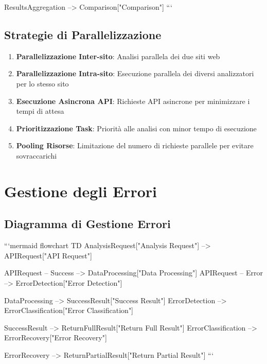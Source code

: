     ResultsAggregation --> Comparison["Comparison"]
```

\subsection{Strategie di Parallelizzazione}
\begin{enumerate}
    \item \textbf{Parallelizzazione Inter-sito}: Analisi parallela dei due siti web
    \item \textbf{Parallelizzazione Intra-sito}: Esecuzione parallela dei diversi analizzatori per lo stesso sito
    \item \textbf{Esecuzione Asincrona API}: Richieste API asincrone per minimizzare i tempi di attesa
    \item \textbf{Prioritizzazione Task}: Priorità alle analisi con minor tempo di esecuzione
    \item \textbf{Pooling Risorse}: Limitazione del numero di richieste parallele per evitare sovraccarichi
\end{enumerate}

\section{Gestione degli Errori}

\subsection{Diagramma di Gestione Errori}

```mermaid
flowchart TD
    AnalysisRequest["Analysis Request"] --> APIRequest["API Request"]
    
    APIRequest -- Success --> DataProcessing["Data Processing"]
    APIRequest -- Error --> ErrorDetection["Error Detection"]
    
    DataProcessing --> SuccessResult["Success Result"]
    ErrorDetection --> ErrorClassification["Error Classification"]
    
    SuccessResult --> ReturnFullResult["Return Full Result"]
    ErrorClassification --> ErrorRecovery["Error Recovery"]
    
    ErrorRecovery --> ReturnPartialResult["Return Partial Result"]
```

